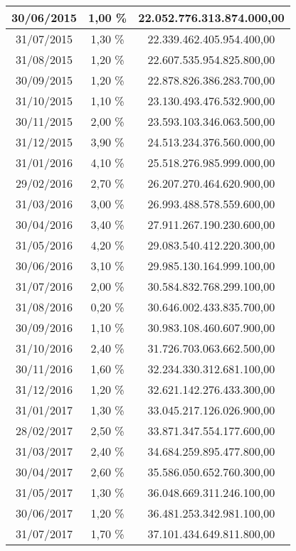 \begin{center}
\begin{longtable}{|c|c|c|}
30/06/2015 & 1,00 \% & 22.052.776.313.874.000,00  \\ \hline
31/07/2015 & 1,30 \% & 22.339.462.405.954.400,00  \\ \hline
31/08/2015 & 1,20 \% & 22.607.535.954.825.800,00  \\ \hline
30/09/2015 & 1,20 \% & 22.878.826.386.283.700,00  \\ \hline
31/10/2015 & 1,10 \% & 23.130.493.476.532.900,00  \\ \hline
30/11/2015 & 2,00 \% & 23.593.103.346.063.500,00  \\ \hline
31/12/2015 & 3,90 \% & 24.513.234.376.560.000,00  \\ \hline
31/01/2016 & 4,10 \% & 25.518.276.985.999.000,00  \\ \hline
29/02/2016 & 2,70 \% & 26.207.270.464.620.900,00  \\ \hline
31/03/2016 & 3,00 \% & 26.993.488.578.559.600,00  \\ \hline
30/04/2016 & 3,40 \% & 27.911.267.190.230.600,00  \\ \hline
31/05/2016 & 4,20 \% & 29.083.540.412.220.300,00  \\ \hline
30/06/2016 & 3,10 \% & 29.985.130.164.999.100,00  \\ \hline
31/07/2016 & 2,00 \% & 30.584.832.768.299.100,00  \\ \hline
31/08/2016 & 0,20 \% & 30.646.002.433.835.700,00  \\ \hline
30/09/2016 & 1,10 \% & 30.983.108.460.607.900,00  \\ \hline
31/10/2016 & 2,40 \% & 31.726.703.063.662.500,00  \\ \hline
30/11/2016 & 1,60 \% & 32.234.330.312.681.100,00  \\ \hline
31/12/2016 & 1,20 \% & 32.621.142.276.433.300,00  \\ \hline
31/01/2017 & 1,30 \% & 33.045.217.126.026.900,00  \\ \hline
28/02/2017 & 2,50 \% & 33.871.347.554.177.600,00  \\ \hline
31/03/2017 & 2,40 \% & 34.684.259.895.477.800,00  \\ \hline
30/04/2017 & 2,60 \% & 35.586.050.652.760.300,00  \\ \hline
31/05/2017 & 1,30 \% & 36.048.669.311.246.100,00  \\ \hline
30/06/2017 & 1,20 \% & 36.481.253.342.981.100,00  \\ \hline
31/07/2017 & 1,70 \% & 37.101.434.649.811.800,00  \\ \hline

\end{longtable}
\end{center}
